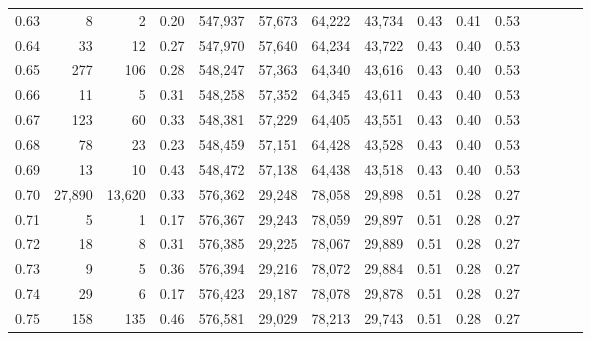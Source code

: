 \begin{tabular}{rrrcrrrrrrrrrrr}
0.63 &       8 &       2 &                                       0.20 &  547,937 &   57,673 &   64,222 &   43,734 &  0.43 &  0.41 &                         0.53 \\
0.64 &      33 &      12 &                                       0.27 &  547,970 &   57,640 &   64,234 &   43,722 &  0.43 &  0.40 &                         0.53 \\
0.65 &     277 &     106 &                                       0.28 &  548,247 &   57,363 &   64,340 &   43,616 &  0.43 &  0.40 &                         0.53 \\
0.66 &      11 &       5 &                                       0.31 &  548,258 &   57,352 &   64,345 &   43,611 &  0.43 &  0.40 &                         0.53 \\
0.67 &     123 &      60 &                                       0.33 &  548,381 &   57,229 &   64,405 &   43,551 &  0.43 &  0.40 &                         0.53 \\
0.68 &      78 &      23 &                                       0.23 &  548,459 &   57,151 &   64,428 &   43,528 &  0.43 &  0.40 &                         0.53 \\
0.69 &      13 &      10 &                                       0.43 &  548,472 &   57,138 &   64,438 &   43,518 &  0.43 &  0.40 &                         0.53 \\
0.70 &  27,890 &  13,620 &                                       0.33 &  576,362 &   29,248 &   78,058 &   29,898 &  0.51 &  0.28 &                         0.27 \\
0.71 &       5 &       1 &                                       0.17 &  576,367 &   29,243 &   78,059 &   29,897 &  0.51 &  0.28 &                         0.27 \\
0.72 &      18 &       8 &                                       0.31 &  576,385 &   29,225 &   78,067 &   29,889 &  0.51 &  0.28 &                         0.27 \\
0.73 &       9 &       5 &                                       0.36 &  576,394 &   29,216 &   78,072 &   29,884 &  0.51 &  0.28 &                         0.27 \\
0.74 &      29 &       6 &                                       0.17 &  576,423 &   29,187 &   78,078 &   29,878 &  0.51 &  0.28 &                         0.27 \\
0.75 &     158 &     135 &                                       0.46 &  576,581 &   29,029 &   78,213 &   29,743 &  0.51 &  0.28 &                         0.27 \\

\end{tabular}
